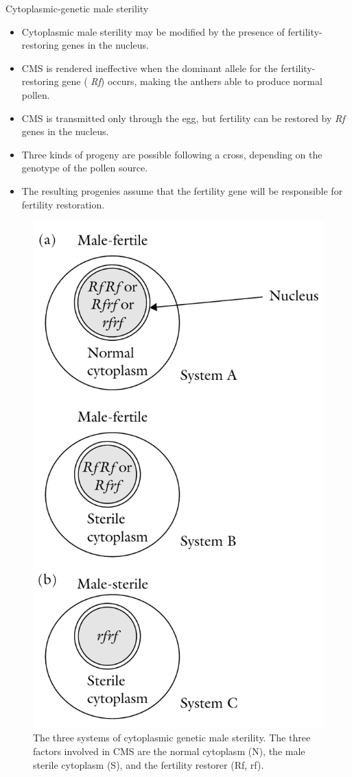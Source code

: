 \documentclass[11pt,ignorenonframetext,aspectratio=169]{beamer}
\providecommand{\tightlist}{%
  \setlength{\itemsep}{0pt}\setlength{\parskip}{0pt}}
\begin{document}
\begin{frame}{Cytoplasmic-genetic male sterility}
\protect\hypertarget{cytoplasmic-genetic-male-sterility}{}
\begin{itemize}
\tightlist
\item
  Cytoplasmic male sterility may be modified by the presence of
  fertility-restoring genes in the nucleus.
\item
  CMS is rendered ineffective when the dominant allele for the
  fertility-restoring gene ( \emph{Rf}) occurs, making the anthers able
  to produce normal pollen.
\item
  CMS is transmitted only through the egg, but fertility can be restored
  by \emph{Rf} genes in the nucleus.
\item
  Three kinds of progeny are possible following a cross, depending on
  the genotype of the pollen source.
\item
  The resulting progenies assume that the fertility gene will be
  responsible for fertility restoration.
\end{itemize}
\end{frame}

\begin{frame}{}
\protect\hypertarget{section-18}{}
\begin{figure}

{\centering \includegraphics[width=0.3\linewidth]{./images/cgms_systems} 

}

\caption{The three systems of cytoplasmic genetic male sterility. The three factors involved in CMS are the normal cytoplasm (N), the male sterile cytoplasm (S), and the fertility restorer (Rf, rf).}\label{fig:cgms-systems}
\end{figure}
\end{frame}
\end{document}
